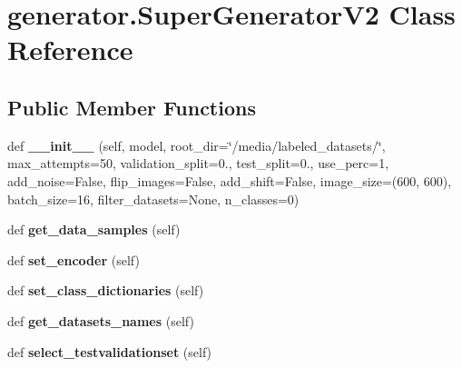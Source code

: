 \hypertarget{classgenerator_1_1SuperGeneratorV2}{}\section{generator.\+Super\+Generator\+V2 Class Reference}
\label{classgenerator_1_1SuperGeneratorV2}
\subsection*{Public Member Functions}
\begin{DoxyCompactItemize}
\item 
\mbox{\label{classgenerator_1_1SuperGeneratorV2_ae1b1da22bfa99b114e434171659ef87f}} 
def {\bfseries \+\_\+\+\_\+init\+\_\+\+\_\+} (self, model, root\+\_\+dir=\char`\"{}/media/labeled\+\_\+datasets/\char`\"{}, max\+\_\+attempts=50, validation\+\_\+split=0., test\+\_\+split=0., use\+\_\+perc=1, add\+\_\+noise=False, flip\+\_\+images=False, add\+\_\+shift=False, image\+\_\+size=(600, 600), batch\+\_\+size=16, filter\+\_\+datasets=None, n\+\_\+classes=0)
\item 
\mbox{\label{classgenerator_1_1SuperGeneratorV2_af8fdbe1e319100d3e9604adf3fc4e458}} 
def {\bfseries get\+\_\+data\+\_\+samples} (self)
\item 
\mbox{\label{classgenerator_1_1SuperGeneratorV2_af665dee138cdcd6cbcfd927f443b92c8}} 
def {\bfseries set\+\_\+encoder} (self)
\item 
\mbox{\label{classgenerator_1_1SuperGeneratorV2_a0759c2fb1389e81a8d03bfcfadab9869}} 
def {\bfseries set\+\_\+class\+\_\+dictionaries} (self)
\item 
\mbox{\label{classgenerator_1_1SuperGeneratorV2_ade3064e0d0a4e4481dbd8367f260bb6f}} 
def {\bfseries get\+\_\+datasets\+\_\+names} (self)
\item 
\mbox{\label{classgenerator_1_1SuperGeneratorV2_a178c9a960b31ad263ee96be27fef9da4}} 
def {\bfseries select\+\_\+testvalidationset} (self)
\item 

\end{DoxyCompactItemize}
